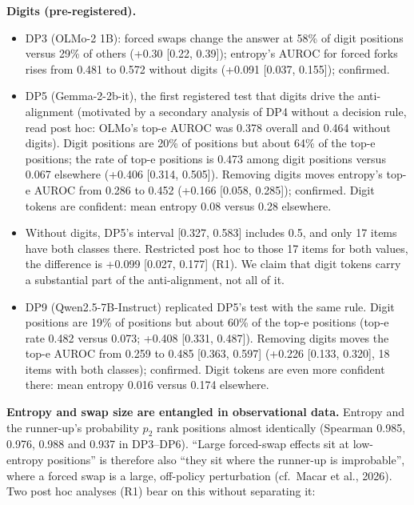 \documentclass[
  10pt,
  a4paper,
]{article}
\providecommand{\tightlist}{%
  \setlength{\itemsep}{0pt}\setlength{\parskip}{0pt}}
\begin{document}
\textbf{Digits (pre-registered).}

\begin{itemize}
\tightlist
\item
  DP3 (OLMo-2 1B): forced swaps change the answer at 58\% of digit positions versus 29\% of others (+0.30 {[}0.22, 0.39{]}); entropy's AUROC for forced forks rises from 0.481 to 0.572 without digits
  (+0.091 {[}0.037, 0.155{]}); confirmed.
\item
  DP5 (Gemma-2-2b-it), the first registered test that digits drive the anti-alignment (motivated by a secondary analysis of DP4 without a decision rule, read post hoc: OLMo's top-e AUROC was 0.378
  overall and 0.464 without digits). Digit positions are 20\% of positions but about 64\% of the top-e positions; the rate of top-e positions is 0.473 among digit positions versus 0.067 elsewhere
  (+0.406 {[}0.314, 0.505{]}). Removing digits moves entropy's top-e AUROC from 0.286 to 0.452 (+0.166 {[}0.058, 0.285{]}); confirmed. Digit tokens are confident: mean entropy 0.08 versus 0.28
  elsewhere.
\item
  Without digits, DP5's interval {[}0.327, 0.583{]} includes 0.5, and only 17 items have both classes there. Restricted post hoc to those 17 items for both values, the difference is +0.099 {[}0.027,
  0.177{]} (R1). We claim that digit tokens carry a substantial part of the anti-alignment, not all of it.
\item
  DP9 (Qwen2.5-7B-Instruct) replicated DP5's test with the same rule. Digit positions are 19\% of positions but about 60\% of the top-e positions (top-e rate 0.482 versus 0.073; +0.408 {[}0.331,
  0.487{]}). Removing digits moves the top-e AUROC from 0.259 to 0.485 {[}0.363, 0.597{]} (+0.226 {[}0.133, 0.320{]}, 18 items with both classes); confirmed. Digit tokens are even more confident
  there: mean entropy 0.016 versus 0.174 elsewhere.
\end{itemize}

\textbf{Entropy and swap size are entangled in observational data.} Entropy and the runner-up's probability \(p_2\) rank positions almost identically (Spearman 0.985, 0.976, 0.988 and 0.937 in
DP3--DP6). ``Large forced-swap effects sit at low-entropy positions'' is therefore also ``they sit where the runner-up is improbable'', where a forced swap is a large, off-policy perturbation
(cf.~Macar et al., 2026). Two post hoc analyses (R1) bear on this without separating it:
\end{document}

